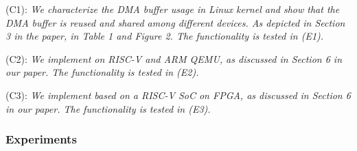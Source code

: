\begin{compactdesc}



    \item[(C1):] \textit{We characterize the DMA buffer usage in Linux kernel and show that the DMA buffer is reused and shared among different devices. As depicted in Section 3 in the paper, in Table 1 and Figure 2. The functionality is tested in (E1).}

    \item[(C2):] \textit{We implement \name on RISC-V and ARM QEMU, as discussed in Section 6 in our paper. The functionality is tested in (E2).}

    \item[(C3):] \textit{We implement \name based on a RISC-V SoC on FPGA, as discussed in Section 6 in our paper. The functionality is tested in (E3).}

\end{compactdesc}

\subsubsection{Experiments}

